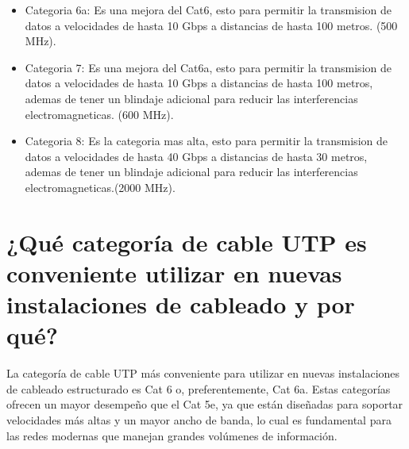 \documentclass[a4paper,12pt]{article}
\begin{document}
\begin{itemize}
\begin{itemize}
        \item Ancho de banda: 250 MHz. (frecuencia).
        \item Velocidad de transmision: Hasta 10 Gbps (10 Gigabit Ethernet) hasta 55 metros, y hasta 1 Gbps hasta 100 metros.
        \item Aplicaciones: Es utilizado en redes de area local (LAN) para aplicaciones que requieren velocidades de hasta 10 Gbps, como la transmision de video en alta definicion, juegos en linea, y aplicaciones empresariales que requieren un alto rendimiento.
        \item Limitaciones: Su construcción (calibre 23 AWG típicamente), lo que hace que sea mas rigido y menos maleable que el Cat5e, lo que puede dificultar su instalacion en espacios reducidos o con curvas pronunciadas.
        \item Los cables CAT 6a se utilizan en edificios y proyectos industriales  que tienen una infraestructura de telecomunicaciones a gran escala. Sin embargo, pueden llegar a una distancia máxima del cableado principal de 100 m.
    \end{itemize}

    \item Categoria 6a: Es una mejora del Cat6, esto para permitir la transmision de datos a velocidades de hasta 10 Gbps a distancias de hasta 100 metros. (500 MHz).
    \item Categoria 7: Es una mejora del Cat6a, esto para permitir la transmision de datos a velocidades de hasta 10 Gbps a distancias de hasta 100 metros, ademas de tener un blindaje adicional para reducir las interferencias electromagneticas. (600 MHz).
    \item Categoria 8: Es la categoria mas alta, esto para permitir la transmision de datos a velocidades de hasta 40 Gbps a distancias de hasta 30 metros, ademas de tener un blindaje adicional para reducir las interferencias electromagneticas.(2000 MHz).
\end{itemize}
\section{¿Qué categoría de cable UTP es conveniente utilizar en nuevas instalaciones de cableado y por qué?}

La categoría de cable UTP más conveniente para utilizar en nuevas instalaciones de cableado
estructurado es Cat 6 o, preferentemente, Cat 6a. Estas categorías ofrecen un mayor
desempeño que el Cat 5e, ya que están diseñadas para soportar velocidades más altas y un
mayor ancho de banda, lo cual es fundamental para las redes modernas que manejan grandes
volúmenes de información.
\end{document}

